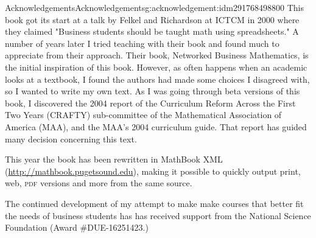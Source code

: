 \documentclass[oneside,10pt,]{book}
\newcommand{\acronym}[1]{\textsc{\MakeLowercase{#1}}}
\numberwithin{equation}{section}
\begin{document}
\begin{acknowledgement}{Acknowledgements}{}{Acknowledgements}{}{}{g:acknowledgement:idm291768498800}
This book got its start at a talk by Felkel and Richardson  at ICTCM in 2000 where they claimed "Business students should be taught math using spreadsheets."  A number of years later I tried teaching with their book and found much to appreciate from their approach.  Their book, Networked Business Mathematics, is the initial inspiration of this book.  However, as often happens when an academic looks at a textbook, I found the authors had made some choices I disagreed with, so I wanted to write my own text.  As I was going through beta versions of this book, I  discovered the 2004 report of the Curriculum Reform Across the First Two Years (CRAFTY) sub-committee of the Mathematical Association of America (MAA), and the MAA's 2004 curriculum guide.  That report has guided many decision concerning this text.%
\par
This year the book has been rewritten in MathBook XML (\href{http://mathbook.pugetsound.edu}{http:\slash{}\slash{}mathbook.pugetsound.edu}), making it possible to quickly output print, web, \acronym{PDF} versions and more from the same source.%
\par
The continued development of my attempt to make make courses that better fit the needs of business students has  has received support from the National Science Foundation (Award \#DUE-16251423.)%
\end{acknowledgement}
%
%
\typeout{************************************************}
\typeout{************************************************}
%
\end{document}
